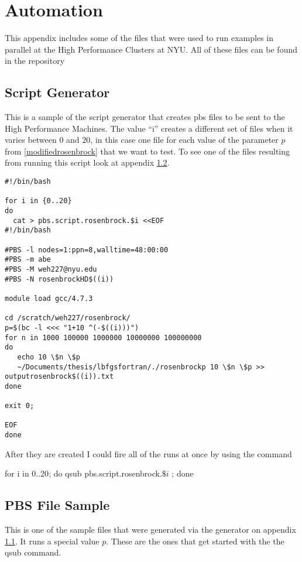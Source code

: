 \chapter{Automation}

This appendix includes some of the files that were used to run examples in parallel at the High Performance Clusters at NYU.  All of these files can be found in the repository \citep{lbfgsbNS}

\section{Script Generator} \label{pbsgenerator}

This is a sample of the script generator that creates pbs files to be sent to the High Performance Machines. The value ``i'' creates a different set of files when it varies between $0$ and $20$, in this case one file for each value of the parameter $p$ from \ref{modifiedrosenbrock} that we want to test. To see one of the files resulting from running this script look at appendix \ref{pbsfile}. 
\lstset{
  language=sh,
  firstnumber = 1
}

\begin{lstlisting}
#!/bin/bash

for i in {0..20}
do
  cat > pbs.script.rosenbrock.$i <<EOF
#!/bin/bash

#PBS -l nodes=1:ppn=8,walltime=48:00:00
#PBS -m abe
#PBS -M weh227@nyu.edu
#PBS -N rosenbrockHD$((i))

module load gcc/4.7.3

cd /scratch/weh227/rosenbrock/
p=$(bc -l <<< "1+10 ^(-$((i)))")
for n in 1000 100000 1000000 10000000 100000000
do
   echo 10 \$n \$p
   ~/Documents/thesis/lbfgsfortran/./rosenbrockp 10 \$n \$p >> outputrosenbrock$((i)).txt
done

exit 0;

EOF
done

\end{lstlisting}
After they are created I could fire all of the runs at once by using the command 

\label{qsubfire}
for i in {0..20}; do qsub pbs.script.rosenbrock.$\$i$ ; done


\section{PBS File Sample} \label{pbsfile}
This is one of the sample files that were generated via the generator on appendix  \ref{pbsgenerator}. It runs a special value $p$.  These are the ones that get started with the the qsub command.

